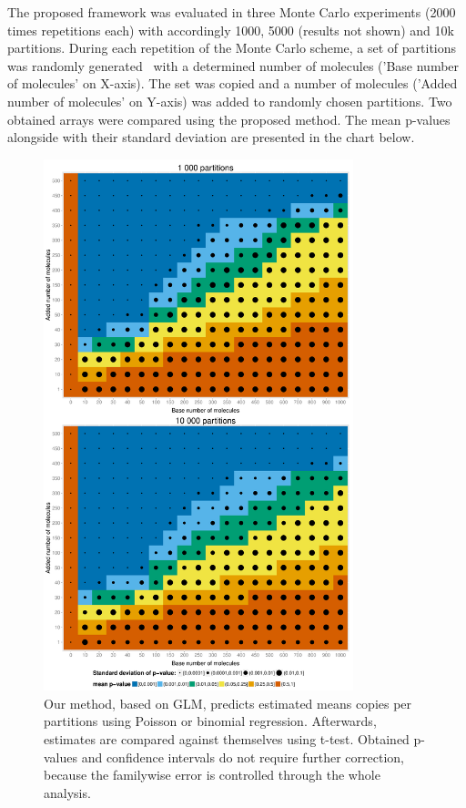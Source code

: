 \documentclass[a4,center,fleqn]{NAR}
\begin{document}
The proposed framework was evaluated in three Monte Carlo experiments (2000 times repetitions each) with accordingly 1000, 5000 (results not shown) and 10k partitions. During each repetition of the Monte Carlo scheme, a set of partitions was randomly generated~\cite{dube_mathematical_2008} with a determined number of molecules ('Base number of molecules' on X-axis). The set was copied and a number of molecules ('Added number of molecules' on Y-axis) was added to randomly chosen partitions. Two obtained arrays were compared using the proposed method. The mean p-values alongside with their standard deviation are presented in the chart below.

\begin{figure}[t]
\begin{center}
\includegraphics[width=9cm]{mc_figures-1.pdf}
\end{center}
\caption{Our method, based on GLM, predicts estimated means copies per partitions using Poisson or binomial regression. Afterwards, estimates are compared against themselves using t-test. Obtained p-values and confidence intervals do not require further correction, because the familywise error is controlled through the whole analysis.}
\label{mc_figures-1}
\end{figure}
\end{document}
